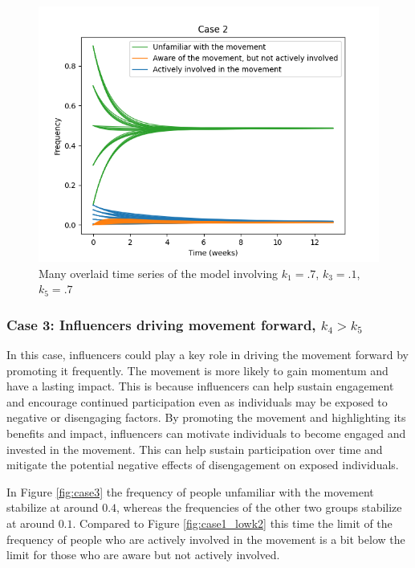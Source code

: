 \documentclass{article}
\begin{document}
    \begin{figure}[H]

        \centering
        \includegraphics[width=\textwidth]{simulation/plots/case2-lowk4.png}   
        \caption{Many overlaid time series of the model involving \mbox{$k_1=.7$}, \mbox{$k_3=.1$}, \mbox{$k_5=.7$}}
        \label{fig:case2_lowk4}
    \end{figure}
    
    \subsubsection*{Case 3: Influencers driving movement forward, $k_4 > k_5$} \normalfont
 
     In this case, influencers could play a key role in driving the movement forward by promoting it frequently. The movement is more likely to gain momentum and have a lasting impact. This is because influencers can help sustain engagement and encourage continued participation even as individuals may be exposed to negative or disengaging factors. By promoting the movement and highlighting its benefits and impact, influencers can motivate individuals to become engaged and invested in the movement. This can help sustain participation over time and mitigate the potential negative effects of disengagement on exposed individuals.

    In Figure \ref{fig:case3} the frequency of people unfamiliar with the movement stabilize at around $0.4$, whereas the frequencies of the other two groups stabilize at around $0.1$. Compared to Figure \ref{fig:case1_lowk2} this time the limit of the frequency of people who are actively involved in the movement is a bit below the limit for those who are aware but not actively involved.
     
\end{document}
